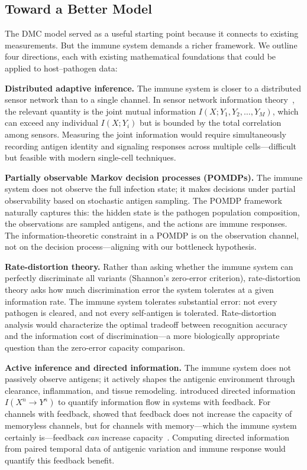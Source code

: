 \documentclass[twocolumn,10pt]{article}
\begin{document}
\subsection{Toward a Better Model}
\label{sec:better}

The DMC model served as a useful starting point because it connects to existing measurements.  But the immune system demands a richer framework.  We outline four directions, each with existing mathematical foundations that could be applied to host--pathogen data:

\textbf{Distributed adaptive inference.}  The immune system is closer to a distributed sensor network than to a single channel.  In sensor network information theory~\citep{cover2006}, the relevant quantity is the joint mutual information $I(X; Y_1, Y_2, \ldots, Y_M)$, which can exceed any individual $I(X; Y_i)$ but is bounded by the total correlation among sensors.  Measuring the joint information would require simultaneously recording antigen identity and signaling responses across multiple cells---difficult but feasible with modern single-cell techniques.

\textbf{Partially observable Markov decision processes (POMDPs).}  The immune system does not observe the full infection state; it makes decisions under partial observability based on stochastic antigen sampling.  The POMDP framework naturally captures this: the hidden state is the pathogen population composition, the observations are sampled antigens, and the actions are immune responses.  The information-theoretic constraint in a POMDP is on the observation channel, not on the decision process---aligning with our bottleneck hypothesis.

\textbf{Rate-distortion theory.}  Rather than asking whether the immune system can perfectly discriminate all variants (Shannon's zero-error criterion), rate-distortion theory asks how much discrimination error the system tolerates at a given information rate.  The immune system tolerates substantial error: not every pathogen is cleared, and not every self-antigen is tolerated.  Rate-distortion analysis would characterize the optimal tradeoff between recognition accuracy and the information cost of discrimination---a more biologically appropriate question than the zero-error capacity comparison.

\textbf{Active inference and directed information.}  The immune system does not passively observe antigens; it actively shapes the antigenic environment through clearance, inflammation, and tissue remodeling.  \citet{massey1990} introduced directed information $I(X^n \to Y^n)$ to quantify information flow in systems with feedback.  For channels with feedback, \citet{shannon1956} showed that feedback does not increase the capacity of memoryless channels, but for channels with memory---which the immune system certainly is---feedback \emph{can} increase capacity~\citep{coverpombra1989}.  Computing directed information from paired temporal data of antigenic variation and immune response would quantify this feedback benefit.
\end{document}
